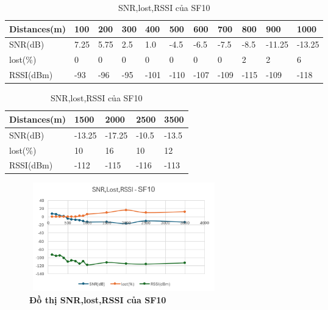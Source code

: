 \documentclass{article} %
\begin{document}
	
	\begin{table}[H]
		\centering
		\begin{tabular}{|l|l|l|l|l|l|l|l|l|l|l|}
			\hline
			\textbf{Distances(m)} & \textbf{100} & \textbf{200} & \textbf{300} & \textbf{400} & \textbf{500} & \textbf{600} & \textbf{700} & \textbf{800} & \textbf{900} & \textbf{1000} \\ \hline
			SNR(dB)       & 7.25         & 5.75         & 2.5          & 1.0          & -4.5         & -6.5         & -7.5         & -8.5         & -11.25       & -13.25        \\ \hline
			lost(\%)      & 0         & 0         & 0         & 0         & 0         & 0         & 0         & 2         & 2         & 6          \\ \hline
			RSSI(dBm)     & -93          & -96          & -95          & -101         & -110         & -107         & -109         & -115         & -109         & -118          \\ \hline
		\end{tabular}
		\caption{SNR,lost,RSSI của SF10  }
		\label{SF10}
		
	\end{table}
	
	\begin{table}[H]
		\centering	
		\begin{tabular}{|l|l|l|l|l|}
			\hline
			\textbf{Distances(m)} & \textbf{1500} & \textbf{2000} & \textbf{2500} & \textbf{3500} \\ \hline
			SNR(dB)       & -13.25        & -17.25        & -10.5         & -13.5         \\ \hline
			lost(\%)      & 10          & 16          & 10          & 12          \\ \hline
			RSSI(dBm)     & -112          & -115          & -116          & -113          \\ \hline
		\end{tabular}
		\caption{SNR,lost,RSSI của SF10  }
		\label{SF10_2}
	\end{table}
	
	\begin{figure}[!ht]
		\centering
		\includegraphics[width=8.2cm,height=4.7cm]{Images/sf10.png}
		\caption[ Đồ thị SNR,lost,RSSI của SF10 ]{\bfseries \fontsize{12pt}{0pt}\selectfont  Đồ thị SNR,lost,RSSI của SF10}
		\label{sf10}
	\end{figure}
\end{document}
